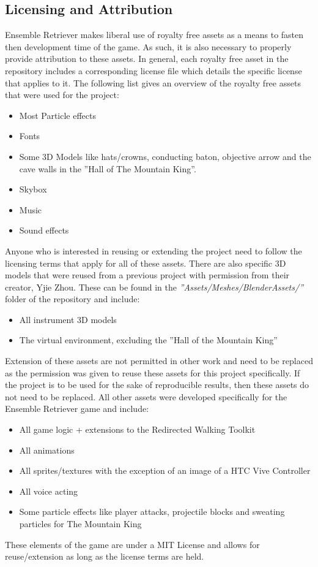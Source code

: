 \subsection{Licensing and Attribution}
Ensemble Retriever makes liberal use of royalty free assets as a means to fasten then development time of the game. As such, it is also necessary to properly provide attribution to these assets. In general, each royalty free asset in the repository includes a corresponding license file which details the specific license that applies to it. The following list gives an overview of the royalty free assets that were used for the project:
\begin{itemize}
    \item Most Particle effects
    \item Fonts
    \item Some 3D Models like hats/crowns, conducting baton, objective arrow and the cave walls in the ''Hall of The Mountain King''.
    \item Skybox
    \item Music
    \item Sound effects
\end{itemize}
Anyone who is interested in reusing or extending the project need to follow the licensing terms that apply for all of these assets. There are also specific 3D models that were reused from a previous project with permission from their creator, Yjie Zhou. These can be found in the \emph{''Assets/Meshes/BlenderAssets/''} folder of the repository and include:
\begin{itemize}
    \item All instrument 3D models
    \item The virtual environment, excluding the ''Hall of the Mountain King''
\end{itemize}
Extension of these assets are not permitted in other work and need to be replaced as the permission was given to reuse these assets for this project specifically. If the project is to be used for the sake of reproducible results, then these assets do not need to be replaced. All other assets were developed specifically for the Ensemble Retriever game and include:
\begin{itemize}
    \item All game logic + extensions to the Redirected Walking Toolkit
    \item All animations
    \item All sprites/textures with the exception of an image of a HTC Vive Controller
    \item All voice acting
    \item Some particle effects like player attacks, projectile blocks and sweating particles for The Mountain King 
\end{itemize}
These elements of the game are under a MIT License and allows for reuse/extension as long as the license terms are held. 


